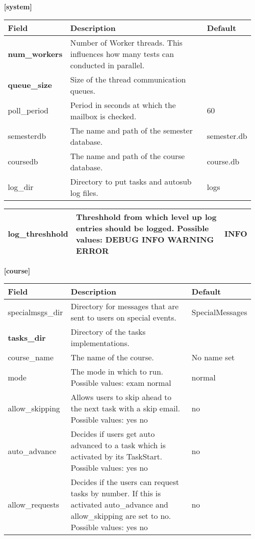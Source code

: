 {\bf [system]}\\
\begin{tabular}{|p{2.5cm}|p{8cm}|p{2.5cm}|}
\hline
{\bf Field} & {\bf Description} & {\bf Default}\\
\hline
\hline
\textbf{num\_workers} & Number of Worker threads. This influences how many tests can conducted 
	in parallel. & ~ \\
\hline
\textbf{queue\_size} & Size of the thread communication queues. & ~\\
\hline
poll\_period & Period in seconds at which the mailbox is checked. & 60\\
\hline
semesterdb & The name and path of the semester database. & semester.db\\
\hline
coursedb &  The name and path of the course database. & course.db\\
\hline
log\_dir & Directory to put tasks and autosub log files. & logs  \\
\hline
\end{tabular}
\begin{tabular}{|p{2.5cm}|p{8cm}|p{2.5cm}|}
\hline
log\_threshhold & Threshhold from which level up log entries should be logged. 
	Possible values: DEBUG INFO WARNING ERROR & INFO\\
\hline
\end{tabular}

{\bf [course]}\\
\begin{tabular}{|p{2.5cm}|p{8cm}|p{2.5cm}|}
\hline
{\bf Field} & {\bf Description} & {\bf Default}\\
\hline
\hline
specialmsgs\_dir & Directory for messages that are sent to users on special events. & 
	SpecialMessages \\
\hline
\textbf{tasks\_dir} & Directory of the tasks implementations. & ~ \\ 
\hline
course\_name & The name of the course. & No name set \\
\hline
mode & The mode in which to run. Possible values: exam normal & normal \\ 
\hline
allow\_skipping & Allows users to skip ahead to the next task with a skip email. 
	Possible values: yes no & no \\
\hline
auto\_advance & Decides if users get auto advanced to a task which is activated by its 
	TaskStart. Possible values: yes no & no \\
\hline
allow\_requests & Decides if the users can request tasks by number. If this is activated 
	auto\_advance and allow\_skipping are set to no. Possible values: yes no & no \\ 
\hline
\end{tabular}

